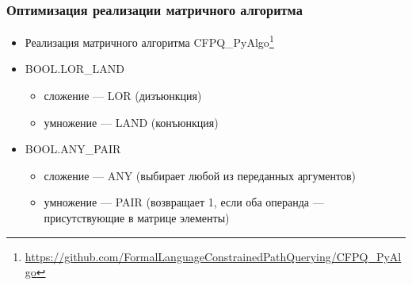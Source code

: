 \documentclass[x11names,dvipsnames,table,aspectratio=169]{beamer}
\begin{document}
\begin{frame}
  \transwipe[direction=90]
  \frametitle{Оптимизация реализации матричного алгоритма}
  \begin{itemize}
    \item Реализация матричного алгоритма CFPQ\_PyAlgo\footnote{\url{https://github.com/FormalLanguageConstrainedPathQuerying/CFPQ_PyAlgo}}
    \item BOOL.LOR\_LAND
    \begin{itemize}
        \item сложение --- LOR (дизъюнкция)
        \item умножение --- LAND (конъюнкция)
    \end{itemize}
    \item BOOL.ANY\_PAIR
    \begin{itemize}
        \item сложение --- ANY (выбирает любой из переданных аргументов)
        \item умножение --- PAIR (возвращает 1, если оба операнда --- присутствующие в матрице элементы)
    \end{itemize}
  \end{itemize}
  
  \begin{center}    
   \end{center}
\end{frame}
\end{document}
